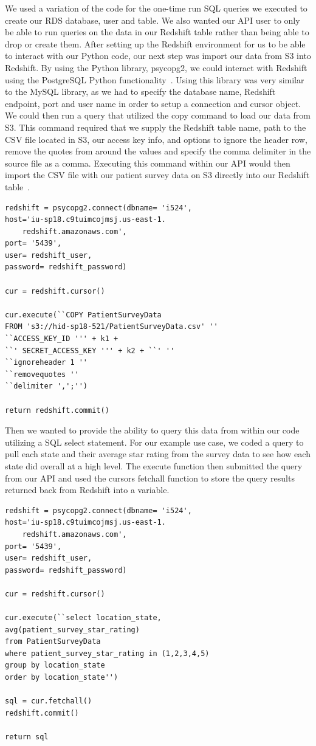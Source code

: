 We used a variation of the code for the one-time run SQL queries we executed 
to create our RDS database, user and table. We also wanted our API user to 
only be able to run queries on the data in our Redshift table rather than 
being able to drop or create them. After setting up the Redshift environment 
for us to be able to interact with our Python code, our next step was import 
our data from S3 into Redshift. By using the Python library, psycopg2, we 
could interact with Redshift using the PostgreSQL Python 
functionality~\cite{hid-sp18-521-redshift-postgreSQL}. Using this library was 
very similar to the MySQL library, as we had to specify the database name, 
Redshift endpoint, port and user name in order to setup a connection and 
cursor object. We could then run a query that utilized the copy command to 
load our data from S3. This command required that we supply the Redshift table 
name, path to the CSV file located in S3, our access key info, and options to 
ignore the header row, remove the quotes from around the values and specify 
the comma delimiter in the source file as a comma. Executing this command 
within our API would then import the CSV file with our patient survey data on 
S3 directly into our Redshift 
table~\cite{hid-sp18-521-redshift-gettingstarted}.  

\begin{verbatim}
redshift = psycopg2.connect(dbname= 'i524', 
host='iu-sp18.c9tuimcojmsj.us-east-1.
	redshift.amazonaws.com',
port= '5439', 
user= redshift_user, 
password= redshift_password)

cur = redshift.cursor()

cur.execute(``COPY PatientSurveyData 
FROM 's3://hid-sp18-521/PatientSurveyData.csv' ''
``ACCESS_KEY_ID ''' + k1 + 
``' SECRET_ACCESS_KEY ''' + k2 + ``' ''
``ignoreheader 1 ''
``removequotes ''
``delimiter ',';'')

return redshift.commit()
\end{verbatim}	

Then we wanted to provide the ability to query this data from within our code 
utilizing a SQL select statement. For our example use case, we coded a query 
to pull each state and their average star rating from the survey data to see 
how each state did overall at a high level. The execute function then 
submitted the query from our API and used the cursors fetchall function to 
store the query results returned back from Redshift into a variable. 

\begin{verbatim}
redshift = psycopg2.connect(dbname= 'i524', 
host='iu-sp18.c9tuimcojmsj.us-east-1.
	redshift.amazonaws.com',
port= '5439', 
user= redshift_user, 
password= redshift_password)

cur = redshift.cursor()

cur.execute(``select location_state, 
avg(patient_survey_star_rating) 
from PatientSurveyData
where patient_survey_star_rating in (1,2,3,4,5) 
group by location_state 
order by location_state'')

sql = cur.fetchall()
redshift.commit()

return sql
\end{verbatim}	


